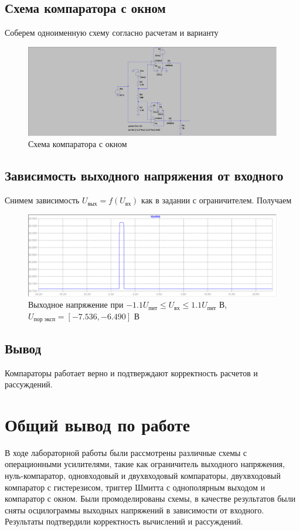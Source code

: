 \documentclass[a4paper, 12pt]{article}
\begin{document}
    \subsection{Схема компаратора с окном}
    Соберем одноименную схему согласно расчетам и варианту
    \begin{figure}[H]
        \centering
        \includegraphics[scale=0.22]{scheme11.png}
        \captionsetup{skip=0pt}
        \caption{Схема компаратора с окном}
        \label{fig:scheme11}
    \end{figure}


    \subsection{Зависимость выходного напряжения от входного}
    Снимем зависимость $U_\text{вых}=f\left( U_\text{вх} \right)$ как в задании с ограничителем.
    Получаем
    \begin{figure}[H]
        \centering
        \includegraphics[scale=0.46]{8task_fuin.png}
        \captionsetup{skip=0pt}
        \caption{Выходное напряжение при $-1.1U_\text{пит}\leq U_\text{вх}\leq 1.1U_\text{пит}$ В, $U_\text{пор эксп}=\left[-7.536,-6.490\right]$ В}
        \label{fig:8task_fuin}
    \end{figure}

    
    \subsection{Вывод}
    Компараторы работает верно и подтверждают корректность расчетов и рассуждений.


    \section{Общий вывод по работе}
    В ходе лабораторной работы были рассмотрены различные схемы
    с операционными усилителями, такие как ограничитель выходного напряжения,
    нуль-компаратор, одновходовый и двухвходовый компараторы, 
    двухвходовый компаратор с гистерезисом, триггер Шмитта с однополярным выходом
    и компаратор с окном. Были промоделированы схемы, в качестве результатов
    были сняты осцилограммы выходных напряжений в зависимости от входного.
    Результаты подтвердили корректность вычислений и рассуждений.
\end{document}
